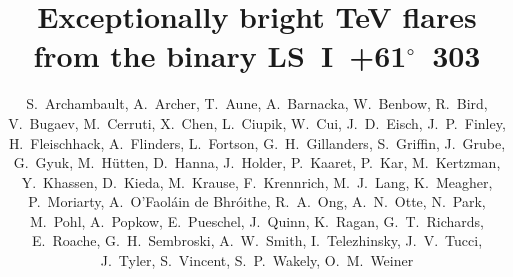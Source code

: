 \documentclass[preprint2]{aastex}
\newcommand{\lsi}{LS~I~+61$^{\circ}$~303}
\begin{document}

\title{Exceptionally bright TeV flares from the binary \lsi{}}


\author{
S.~Archambault,
A.~Archer,
T.~Aune,
A.~Barnacka,
W.~Benbow,
R.~Bird,
V.~Bugaev,
M.~Cerruti,
X.~Chen,
L.~Ciupik,
W.~Cui,
J.~D.~Eisch,
J.~P.~Finley,
H.~Fleischhack,
A.~Flinders,
L.~Fortson,
G.~H.~Gillanders,
S.~Griffin,
J.~Grube,
G.~Gyuk,
M.~H\"{u}tten,
D.~Hanna,
J.~Holder,
P.~Kaaret,
P.~Kar,
M.~Kertzman,
Y.~Khassen,
D.~Kieda,
M.~Krause,
F.~Krennrich,
M.~J.~Lang,
K.~Meagher,
P.~Moriarty,
A.~O'Faol\'{a}in de Bhr\'{o}ithe,
R.~A.~Ong,
A.~N.~Otte,
N.~Park,
M.~Pohl,
A.~Popkow,
E.~Pueschel,
J.~Quinn,
K.~Ragan,
G.~T.~Richards,
E.~Roache,
G.~H.~Sembroski,
A.~W.~Smith,
I.~Telezhinsky,
J.~V.~Tucci,
J.~Tyler,
S.~Vincent,
S.~P.~Wakely,
O.~M.~Weiner
}
\end{document}
